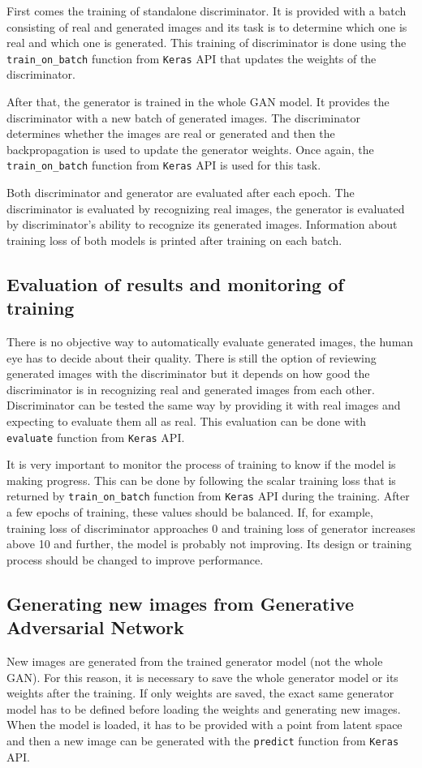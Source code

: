 First comes the training of standalone discriminator. It is provided with a batch consisting of real and generated images and its task is to determine which one is real and which one is generated. This training of discriminator is done using the \texttt{train\_on\_batch} function from \texttt{Keras} API that updates the weights of the discriminator.

After that, the generator is trained in the whole GAN model. It provides the discriminator with a new batch of generated images. The discriminator determines whether the images are real or generated and then the backpropagation is used to update the generator weights. Once again, the \texttt{train\_on\_batch} function from \texttt{Keras} API is used for this task.

Both discriminator and generator are evaluated after each epoch. The discriminator is evaluated by recognizing real images, the generator is evaluated by discriminator's ability to recognize its generated images. Information about training loss of both models is printed after training on each batch.

\subsection*{Evaluation of results and monitoring of training}
There is no objective way to automatically evaluate generated images, the human eye has to decide about their quality. There is still the option of reviewing generated images with the discriminator but it depends on how good the discriminator is in recognizing real and generated images from each other. Discriminator can be tested the same way by providing it with real images and expecting to evaluate them all as real. This evaluation can be done with \texttt{evaluate} function from \texttt{Keras} API.

It is very important to monitor the process of training to know if the model is making progress. This can be done by following the scalar training loss that is returned by \texttt{train\_on\_batch} function from \texttt{Keras} API during the training. After a few epochs of training, these values should be balanced. If, for example, training loss of discriminator approaches 0 and training loss of generator increases above 10 and further, the model is probably not improving. Its design or training process should be changed to improve performance.

\subsection*{Generating new images from Generative Adversarial Network}
New images are generated from the trained generator model (not the whole GAN). For this reason, it is necessary to save the whole generator model or its weights after the training. If only weights are saved, the exact same generator model has to be defined before loading the weights and generating new images. When the model is loaded, it has to be provided with a point from latent space and then a new image can be generated with the \texttt{predict} function from \texttt{Keras} API.

